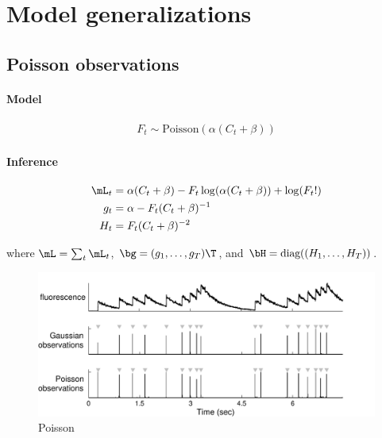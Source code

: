 \section{Model generalizations} \label{sec:model2}

\subsection{Poisson observations}
\paragraph{Model}

\begin{align}
	F_t \sim \text{Poisson}(\alpha (C_t + \beta))
\end{align}


\paragraph{Inference}

\begin{subequations} 
\begin{align}
\mL_{t} &= \alpha (C_t + \beta) - F_{t} \log(\alpha(C_t + \beta)) + \log(F_{t}!)  \\
g_{t} &= \alpha - F_{t}(C_t + \beta)^{-1} \\
H_{t} &= F_{t} (C_t + \beta)^{-2}
\end{align}
\end{subequations}

\noindent where $\mL=\sum_{t} \mL_{t}$, $\bg=(g_{1}, \ldots, g_{T})\T$, and $\bH=\text{diag}((H_1, \ldots, H_T))$.

\begin{figure}[h!]
\centering \includegraphics[width=.9\linewidth]{../figs/poisson}
\caption{Poisson} \label{fig:poiss}
\end{figure}


